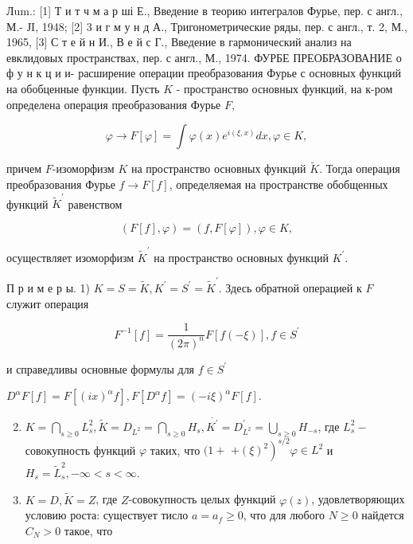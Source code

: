 \documentclass[10pt]{article}
\begin{document}
Лum.: [1] Т и т ч м а р ші Е., Введение в теорию интегралов Фурье, пер. с англ., М.- ЈI, 1948; [2] 3 и г м у н д А., Тригонометрические ряды, пер. с англ., т. 2, М., 1965, [3] С т е й н И., В е й с Г., Введение в гармонический анализ на евклидовых пространствах, пер. с англ., М., 1974. ФУРБЕ ПРЕОБРАЗОВАНИЕ о ф у н к ц и и- расширение операции преобразования Фурье с основных функций на обобценные функции. Пусть $K$ - пространство основных функций, на к-ром определена операция преобразования Фурье $F$,



\[

\varphi \longrightarrow F[\varphi]=\int \varphi(x) e^{i(\xi, x)} d x, \varphi \in K,

\]



причем $F$-изоморфизм $K$ на пространство основных функций $\tilde{K}$. Тогда операция преобразования Фурье $f \rightarrow F[f]$, определяемая на пространстве обобщенных функций $\tilde{K}^{\prime}$ равенством



\[

(F[f], \varphi)=(f, F[\varphi]), \varphi \in K,

\]



осуществляет изоморфизм $\tilde{K}^{\prime}$ на пространство основных функций $K^{\prime}$.



П р и м е р ы. 1) $K=S=\tilde{K}, K^{\prime}=S^{\prime}=\tilde{K}^{\prime}$. Здесь обратной операцией к $F$ служит операция



\[

F^{-1}[f]=\frac{1}{(2 \pi)^{n}} F[f(-\xi)], f \in S^{\prime}

\]



и справедливы основные формулы для $f \in S^{\prime}$



$D^{\alpha} F[f]=F\left[(i x)^{\alpha} f\right], F\left[D^{\alpha} f\right]=(-i \xi)^{\alpha} F[f]$.



\begin{enumerate}

  \setcounter{enumi}{1}

  \item $K=\bigcap_{s \geqslant 0} L_{s}^{2}, \tilde{K}=D_{L^{2}}=\bigcap_{s \geqslant 0} H_{s}, \overline{K^{\prime}}=D_{L^{2}}^{\prime}=\bigcup_{s \geqslant 0} H_{-s}$, где $L_{s}^{2}-$ совокупность функций $\varphi$ таких, что $(1+$ $\left.+(\xi)^{2}\right)^{s / 2} \varphi \in L^{2}$ и $H_{s}=\tilde{L}_{s}^{2},-\infty<s<\infty$.



  \item $K=D, \tilde{K}=Z$, где $Z$-совокупность целых функций $\varphi(z)$, удовлетворяющих условию роста: существует тисло $a=a_{f} \geqslant 0$, что для любого $N \geqslant 0$ найдется $C_{N}>0$ такое, что



\end{enumerate}
\end{document}
